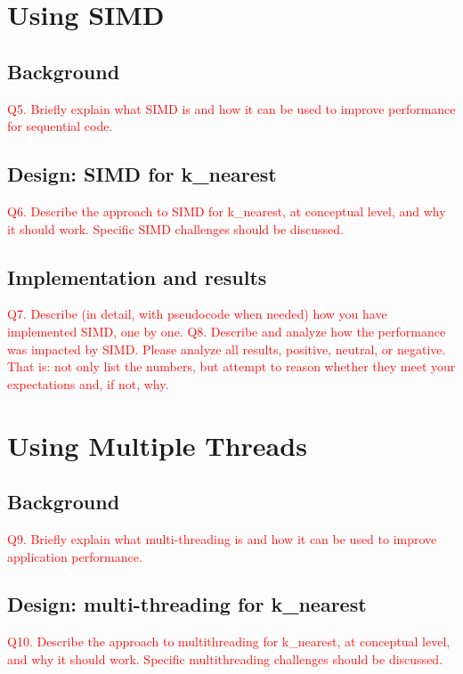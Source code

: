 \documentclass[11pt]{article}
\newcommand \question[1]{\textcolor{red}{#1}}
\begin{document}
\section{Using SIMD}

\subsection{Background}
\question{Q5. Briefly explain what SIMD is and how it can be used to improve performance for sequential code.}

\subsection{Design: SIMD for k\_nearest}
\question{Q6. Describe the approach to SIMD for k\_nearest, at conceptual level, and why it should work. Specific SIMD challenges should be discussed.}

\subsection{Implementation and results}

\question{Q7. Describe (in detail, with pseudocode when needed) how you have implemented SIMD, one by one.}
\question{Q8. Describe and analyze how the performance was impacted by SIMD. Please analyze all results, positive, neutral, or negative. That is: not only list the numbers, but attempt to reason whether they meet your expectations and, if not, why.}


\section{Using Multiple Threads}

\subsection{Background}
\question{Q9. Briefly explain what multi-threading is and how it can be used to improve application performance.}

\subsection{Design: multi-threading for k\_nearest}
\question{Q10. Describe the approach to multithreading for k\_nearest, at conceptual level, and why it should work. Specific multithreading challenges should be discussed.}
\end{document}
